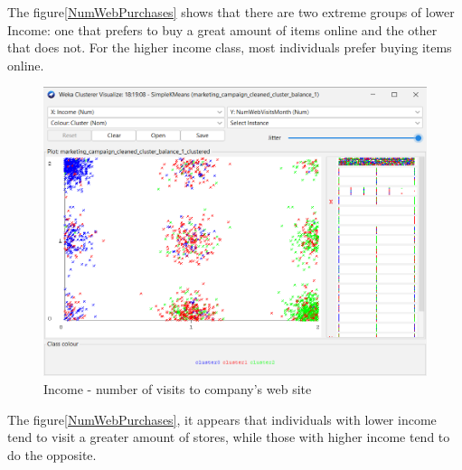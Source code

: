 The figure\ref{NumWebPurchases} shows that there are two extreme groups of lower Income: one that prefers to buy a great amount of items online and the other that does not. For the higher income class, most individuals prefer buying items online.

\begin{figure}[H]
  \includegraphics[scale=0.6]{imgs/cluster_income_webvisit}
  \centering
  \caption{Income - number of visits to company’s web site}
  \label{VisitPermonths}
\end{figure}

The figure\ref{NumWebPurchases}, it appears that individuals with lower income tend to visit a greater amount of stores, while those with higher income tend to do the opposite.